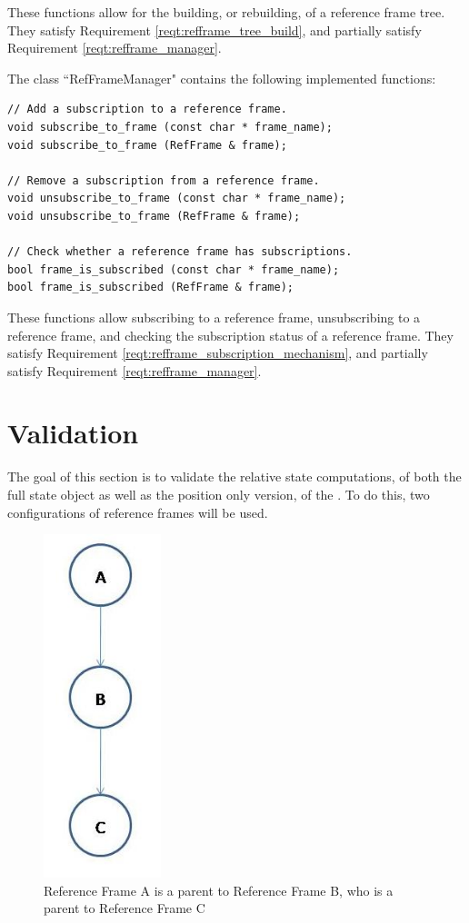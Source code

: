 These functions allow for the building, or rebuilding, of a reference frame tree.
They satisfy Requirement \ref{reqt:refframe_tree_build}, and partially
satisfy Requirement \ref{reqt:refframe_manager}.

The class ``RefFrameManager" contains the following implemented functions:

\begin{verbatim}
// Add a subscription to a reference frame.
void subscribe_to_frame (const char * frame_name);
void subscribe_to_frame (RefFrame & frame);

// Remove a subscription from a reference frame.
void unsubscribe_to_frame (const char * frame_name);
void unsubscribe_to_frame (RefFrame & frame);

// Check whether a reference frame has subscriptions.
bool frame_is_subscribed (const char * frame_name);
bool frame_is_subscribed (RefFrame & frame);
\end{verbatim}

These functions allow subscribing to a reference frame, unsubscribing to a reference frame, and
checking the subscription status of a reference frame. They satisfy
Requirement \ref{reqt:refframe_subscription_mechanism}, and partially satisfy
Requirement \ref{reqt:refframe_manager}.

\section{Validation}

The goal of this section is to validate the relative state computations, of both
the full state object as well as the position only version, of the
. To do this, two configurations of reference frames will be used.

\begin{figure}[H]
\begin{center}
\includegraphics[height=100mm]{figs/verif_case_1.jpg}
\caption{Reference Frame A is a parent to Reference Frame B, who is a parent to
Reference Frame C}
\label{fig:verif_config_1}
\end{center}
\end{figure}

